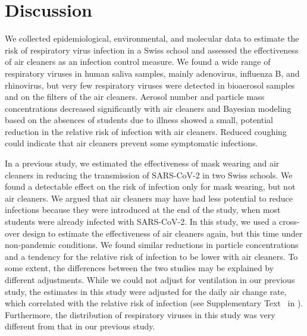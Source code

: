 \documentclass[fleqn,11pt]{wlscirep}
\begin{document}
\FloatBarrier

\newpage

\section{Discussion}


We collected epidemiological, environmental, and molecular data to estimate the risk of respiratory virus infection in a Swiss school and assessed the effectiveness of air cleaners as an infection control measure. We found a wide range of respiratory viruses in human saliva samples, mainly adenovirus, influenza B, and rhinovirus, but very few respiratory viruses were detected in bioaerosol samples and on the filters of the air cleaners. Aerosol number and particle mass concentrations decreased significantly with air cleaners and Bayesian modeling based on the absences of students due to illness showed a small, potential reduction in the relative risk of infection with air cleaners. Reduced coughing could indicate that air cleaners prevent some symptomatic infections.


In a previous study\cite{Banholzer2023PLoSMed}, we estimated the effectiveness of mask wearing and air cleaners in reducing the transmission of SARS-CoV-2 in two Swiss schools. We found a detectable effect on the risk of infection only for mask wearing, but not air cleaners. We argued that air cleaners may have had less potential to reduce infections because they were introduced at the end of the study, when most students were already infected with SARS-CoV-2. In this study, we used a cross-over design to estimate the effectiveness of air cleaners again, but this time under non-pandemic conditions. We found similar reductions in particle concentrations and a tendency for the relative risk of infection to be lower with air cleaners. To some extent, the differences between the two studies may be explained by different adjustments. While we could not adjust for ventilation in our previous study, the estimates in this study were adjusted for the daily air change rate, which correlated with the relative risk of infection (see Supplementary Text~ in \supp). Furthermore, the distribution of respiratory viruses in this study was very different from that in our previous study. 

\end{document}
